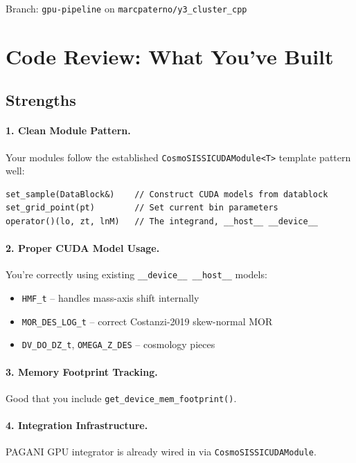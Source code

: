\documentclass[a4paper, 11pt]{article}
\begin{document}
Branch: \texttt{gpu-pipeline} on \texttt{marcpaterno/y3\_cluster\_cpp}

\section{Code Review: What You've Built}
\label{sec:review}

\subsection{Strengths}

\paragraph{1. Clean Module Pattern.}
Your modules follow the established \texttt{CosmoSISSICUDAModule<T>} template pattern well:

\begin{lstlisting}
set_sample(DataBlock&)    // Construct CUDA models from datablock
set_grid_point(pt)        // Set current bin parameters
operator()(lo, zt, lnM)   // The integrand, __host__ __device__
\end{lstlisting}

\paragraph{2. Proper CUDA Model Usage.}
You're correctly using existing \texttt{\_\_device\_\_ \_\_host\_\_} models:
\begin{itemize}
  \setlength\itemsep{2pt}
  \item \texttt{HMF\_t} -- handles mass-axis shift internally
  \item \texttt{MOR\_DES\_LOG\_t} -- correct Costanzi-2019 skew-normal MOR
  \item \texttt{DV\_DO\_DZ\_t}, \texttt{OMEGA\_Z\_DES} -- cosmology pieces
\end{itemize}

\paragraph{3. Memory Footprint Tracking.}
Good that you include \texttt{get\_device\_mem\_footprint()}.

\paragraph{4. Integration Infrastructure.}
PAGANI GPU integrator is already wired in via \texttt{CosmoSISSICUDAModule}.
\end{document}
